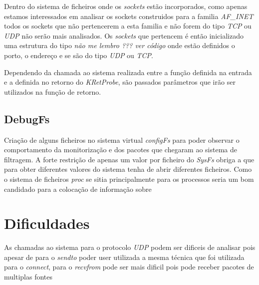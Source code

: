 Dentro do sistema de ficheiros onde os \textit{sockets} estão incorporados, como apenas estamos interessados em analisar os sockets construidos para a
familia \textit{AF\_INET} todos os sockets que não pertencerem a esta familia e não forem do tipo \textit{TCP} ou \textit{UDP} não serão mais analisados.
 Os \textit{sockets} que pertencem é então inicializado uma estrutura do tipo \textit{não me lembro ??? ver código} onde estão definidos o porto, o endereço
e se são do tipo \textit{UDP} ou \textit{TCP}.

Dependendo da chamada ao sistema realizada entre a função definida na entrada e a definida no retorno do \textit{KRetProbe}, são passados parâmetros que irão
ser utilizados na função de retorno.


\subsection{DebugFs}
Criação de alguns ficheiros no sistema virtual \textit{configFs} para poder observar o comportamento da monitorização e dos pacotes que chegaram ao sistema de filtragem.
A forte restrição de apenas um valor por ficheiro do \textit{SysFs} obriga a que para obter diferentes valores do sistema tenha de abrir diferentes ficheiros.
 Como o sistema de ficheiros \textit{proc} se sitia principalmente para os processos seria um bom candidado para a colocação de informação sobre 


\section{Dificuldades}
 As chamadas ao sistema para o protocolo \textit{UDP} podem ser dificeis de analisar pois apesar de para o \textit{sendto} poder user utilizada a mesma técnica que foi utilizada para o \textit{connect}, para o \textit{recvfrom} pode ser mais dificil pois pode receber pacotes de multiplas fontes
